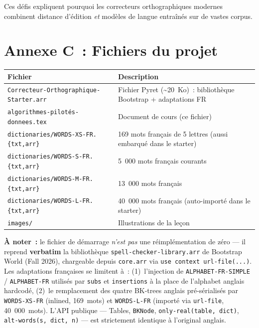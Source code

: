 \documentclass[12pt,a4paper]{article}
\begin{document}
Ces défis expliquent pourquoi les correcteurs orthographiques modernes combinent distance d'édition \emph{et} modèles de langue entraînés sur de vastes corpus.

\section*{Annexe C~: Fichiers du projet}

\begin{center}
\begin{tabularx}{\textwidth}{l X}
  \toprule
  \textbf{Fichier} & \textbf{Description} \\
  \midrule
  \texttt{Correcteur-Orthographique-Starter.arr} & Fichier Pyret (\textasciitilde20~Ko)~: bibliothèque Bootstrap + adaptations FR \\
  \texttt{algorithmes-pilotés-donnees.tex} & Document de cours (ce fichier) \\
  \texttt{dictionaries/WORDS-XS-FR.\{txt,arr\}} & 169 mots français de 5 lettres (aussi embarqué dans le starter) \\
  \texttt{dictionaries/WORDS-S-FR.\{txt,arr\}}  & 5~000 mots français courants \\
  \texttt{dictionaries/WORDS-M-FR.\{txt,arr\}}  & 13~000 mots français \\
  \texttt{dictionaries/WORDS-L-FR.\{txt,arr\}}  & 40~000 mots français (auto-importé dans le starter) \\
  \texttt{images/} & Illustrations de la leçon \\
  \bottomrule
\end{tabularx}
\end{center}

\vspace{1em}
\textbf{À noter~:} le fichier de démarrage \emph{n'est pas} une réimplémentation de zéro — il reprend \textbf{verbatim} la bibliothèque \texttt{spell-checker-library.arr} de Bootstrap World (Fall 2026), chargeable depuis \texttt{core.arr} via \texttt{use context url-file(...)}. Les adaptations françaises se limitent à~: (1)~l'injection de \texttt{ALPHABET-FR-SIMPLE} / \texttt{ALPHABET-FR} utilisés par \texttt{subs} et \texttt{insertions} à la place de l'alphabet anglais hardcodé, (2)~le remplacement des quatre BK-trees anglais pré-sérialisés par \texttt{WORDS-XS-FR} (inlined, 169~mots) et \texttt{WORDS-L-FR} (importé via \texttt{url-file}, 40~000~mots). L'API publique — Tables, \texttt{BKNode}, \texttt{only-real(table, dict)}, \texttt{alt-words(s, dict, n)} — est strictement identique à l'original anglais.
\end{document}
